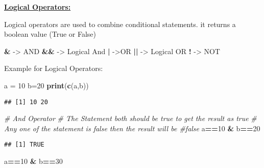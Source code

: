 \documentclass[
]{article}
\newenvironment{Shaded}{\begin{snugshade}}{\end{snugshade}}
\newcommand{\CommentTok}[1]{\textcolor[rgb]{0.56,0.35,0.01}{\textit{#1}}}
\newcommand{\DecValTok}[1]{\textcolor[rgb]{0.00,0.00,0.81}{#1}}
\newcommand{\FunctionTok}[1]{\textcolor[rgb]{0.13,0.29,0.53}{\textbf{#1}}}
\newcommand{\NormalTok}[1]{#1}
\newcommand{\OtherTok}[1]{\textcolor[rgb]{0.56,0.35,0.01}{#1}}
\newcommand{\SpecialCharTok}[1]{\textcolor[rgb]{0.81,0.36,0.00}{\textbf{#1}}}
\begin{document}
\newpage

\ul{\textbf{Logical Operators:}}

Logical operators are used to combine conditional statements. it returns
a boolean value (True or False)

\begin{Shaded}
\begin{Highlighting}[]
\SpecialCharTok{\&} \OtherTok{{-}\textgreater{}}\NormalTok{ AND}
\SpecialCharTok{\&\&} \OtherTok{{-}\textgreater{}}\NormalTok{ Logical And}
\SpecialCharTok{|} \OtherTok{{-}\textgreater{}}\NormalTok{OR}
\SpecialCharTok{||} \OtherTok{{-}\textgreater{}}\NormalTok{ Logical OR}
\SpecialCharTok{!} \OtherTok{{-}\textgreater{}}\NormalTok{ NOT}
\end{Highlighting}
\end{Shaded}

Example for Logical Operators:

\begin{Shaded}
\begin{Highlighting}[]
\NormalTok{a }\OtherTok{=} \DecValTok{10}
\NormalTok{b}\OtherTok{=}\DecValTok{20}
\FunctionTok{print}\NormalTok{(}\FunctionTok{c}\NormalTok{(a,b))}
\end{Highlighting}
\end{Shaded}

\begin{verbatim}
## [1] 10 20
\end{verbatim}

\begin{Shaded}
\begin{Highlighting}[]
\CommentTok{\# And Operator}
\CommentTok{\# The Statement both should be true to get the result as true}
\CommentTok{\# Any one of the statement is false then the result will be \#false}
\NormalTok{a}\SpecialCharTok{==}\DecValTok{10} \SpecialCharTok{\&}\NormalTok{ b}\SpecialCharTok{==}\DecValTok{20}
\end{Highlighting}
\end{Shaded}

\begin{verbatim}
## [1] TRUE
\end{verbatim}

\begin{Shaded}
\begin{Highlighting}[]
\NormalTok{a}\SpecialCharTok{==}\DecValTok{10} \SpecialCharTok{\&}\NormalTok{ b}\SpecialCharTok{==}\DecValTok{30}
\end{Highlighting}
\end{Shaded}
\end{document}
